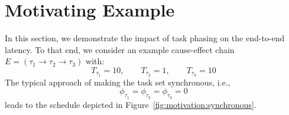 \documentclass[10pt,conference]{resources/IEEEtran}
\theoremstyle{definition}
\begin{document}
\section{Motivating Example}
\label{sec:motivation}

	In this section, we demonstrate the impact of task phasing on the end-to-end latency. 
	To that end, we consider an example cause-effect chain $E = (\tau_1 \to \tau_2 \to \tau_3)$ with: 
	\begin{equation}
		T_{\tau_1} = 10, \qquad T_{\tau_2}=1, \qquad T_{\tau_3}=10
	\end{equation}
	The typical approach of making the task set synchronous, i.e., 
	\begin{equation}
		\phi_{\tau_1} = \phi_{\tau_2} = \phi_{\tau_3} = 0 
	\end{equation}
	leads to the schedule depicted in Figure~\ref{fig:motivation:synchronous}.
\end{document}
